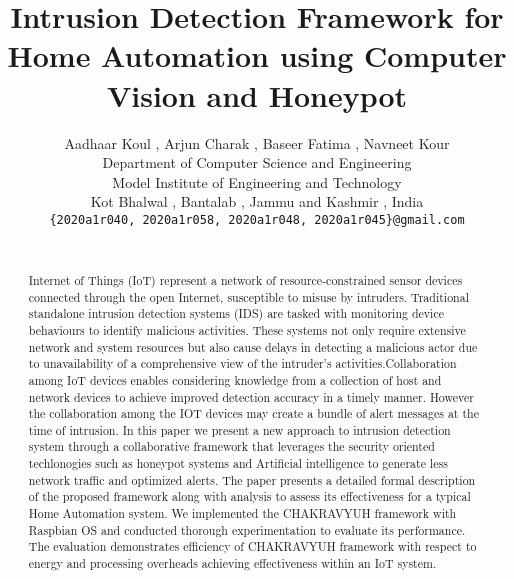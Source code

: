 \documentclass[letterpaper, 10 pt, conference]{ieeeconf}  %
\title{\LARGE \bf
Intrusion Detection Framework for Home Automation using Computer Vision and Honeypot 
}
\author{Aadhaar Koul , Arjun Charak , Baseer Fatima , Navneet Kour%
\\ Department of Computer Science and Engineering \\
Model Institute of Engineering and Technology \\
Kot Bhalwal , Bantalab , Jammu and Kashmir , India \\
{\tt\small\{2020a1r040, 2020a1r058, 2020a1r048, 2020a1r045\}@gmail.com} \\ \\
}
\begin{document}
\maketitle
\thispagestyle{plain}
\pagestyle{plain}



\begin{abstract}
Internet of Things (IoT) represent a network of resource-constrained sensor devices connected through the open Internet, susceptible to misuse by intruders. Traditional standalone intrusion detection systems (IDS) are tasked with monitoring device behaviours to identify malicious activities. These systems not only require extensive network and system resources but also cause delays in detecting a malicious actor due to unavailability of a comprehensive view of the intruder's activities.Collaboration among IoT devices enables considering knowledge from a collection of host and network devices to achieve improved detection accuracy in a timely manner. However the collaboration among the IOT devices may create a bundle of alert messages at the time of intrusion. In this paper we present a new approach to intrusion detection system through a collaborative framework that leverages the security oriented techlonogies such as honeypot systems and Artificial intelligence to generate less network traffic and optimized alerts. The paper presents a detailed formal description of the proposed framework along with analysis to assess its effectiveness for a typical Home Automation system. We implemented the CHAKRAVYUH framework with Raspbian OS and conducted thorough experimentation to evaluate its performance. The evaluation demonstrates efficiency of CHAKRAVYUH framework with respect to energy and processing overheads achieving effectiveness within an IoT system.

\end{abstract}

\begin{keywords}


\end{keywords}

\end{document}
